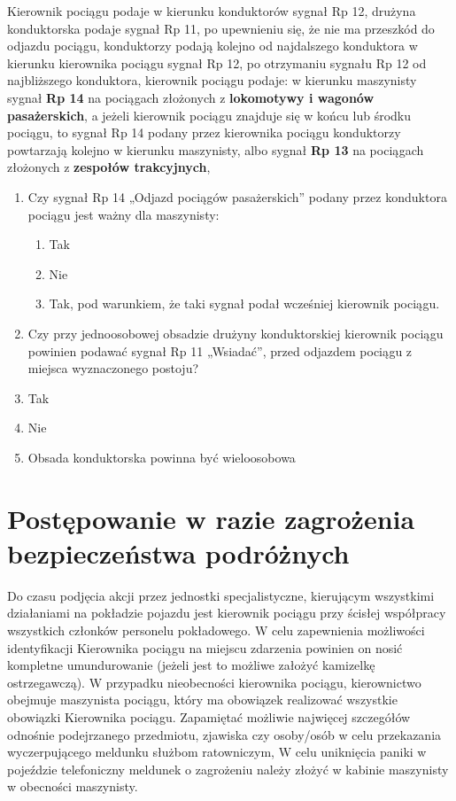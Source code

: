 Kierownik pociągu podaje w kierunku konduktorów sygnał Rp 12, drużyna konduktorska podaje sygnał Rp 11, po upewnieniu się, że nie ma przeszkód do odjazdu pociągu, konduktorzy podają kolejno od najdalszego konduktora w kierunku kierownika pociągu sygnał Rp 12, po otrzymaniu sygnału Rp 12 od najbliższego konduktora, kierownik pociągu podaje: w kierunku maszynisty sygnał \textbf{Rp 14} na pociągach złożonych z \textbf{lokomotywy i wagonów pasażerskich}, a jeżeli kierownik pociągu znajduje się w końcu lub środku pociągu, to sygnał Rp 14 podany przez kierownika pociągu konduktorzy powtarzają kolejno w kierunku maszynisty, albo sygnał \textbf{Rp 13} na pociągach złożonych z \textbf{zespołów trakcyjnych},
\begin{tcolorbox}[colback=black!5!white,colframe=white!55!black,title=Pytania testowe]
	\begin{enumerate}
		\item Czy sygnał Rp 14 „Odjazd pociągów pasażerskich” podany przez konduktora pociągu jest ważny dla maszynisty:
		\begin{enumerate}
			\item Tak
			\item Nie
			\item Tak, pod warunkiem, że taki sygnał podał wcześniej kierownik pociągu.
		\end{enumerate}
		\item Czy przy jednoosobowej obsadzie drużyny konduktorskiej kierownik pociągu powinien podawać sygnał Rp 11 „Wsiadać”, przed odjazdem pociągu z miejsca wyznaczonego postoju?
		\item Tak
		\item Nie
		\item Obsada konduktorska powinna być wieloosobowa
	\end{enumerate}
\end{tcolorbox}

\chapter{Postępowanie w razie zagrożenia bezpieczeństwa podróżnych}
Do czasu podjęcia akcji przez jednostki specjalistyczne, kierującym wszystkimi działaniami na pokładzie pojazdu jest kierownik pociągu przy ścisłej współpracy wszystkich członków personelu pokładowego. 
W celu zapewnienia możliwości identyfikacji Kierownika pociągu na miejscu zdarzenia powinien on nosić kompletne umundurowanie (jeżeli jest to możliwe założyć kamizelkę ostrzegawczą). 
W przypadku nieobecności kierownika pociągu, kierownictwo obejmuje maszynista pociągu, który ma obowiązek realizować wszystkie obowiązki Kierownika pociągu.
Zapamiętać możliwie najwięcej szczegółów odnośnie podejrzanego przedmiotu, zjawiska czy osoby/osób w celu przekazania wyczerpującego meldunku służbom ratowniczym,
W celu uniknięcia paniki w pojeździe telefoniczny meldunek o zagrożeniu należy złożyć w kabinie maszynisty w obecności maszynisty.

